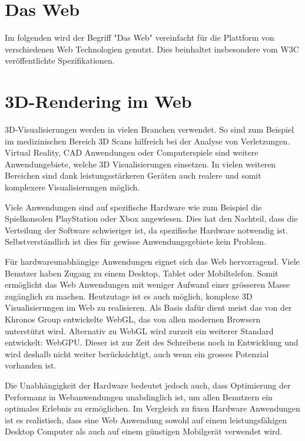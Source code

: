 \section{Das Web}
Im folgenden wird der Begriff "Das Web" vereinfacht für die Plattform von verschiedenen Web Technologien genutzt. Dies beinhaltet insbesondere vom W3C veröffentlichte Spezifikationen.

\section{3D-Rendering im Web}
3D-Visualisierungen werden in vielen Branchen verwendet.
So sind zum Beispiel im medizinischen Bereich 3D Scans hilfreich bei der Analyse von Verletzungen.
Virtual Reality, CAD Anwendungen oder Computerspiele sind weitere Anwendungebiete, welche 3D Visualisierungen einsetzen.
In vielen weiteren Bereichen sind dank leistungsstärkeren Geräten auch realere und somit komplexere Visualisierungen möglich. 

Viele Anwendungen sind auf spezifische Hardware wie zum Beispiel die Spielkonsolen PlayStation oder Xbox angewiesen. Dies hat den Nachteil, dass die Verteilung der Software schwieriger ist, da spezifische Hardware notwendig ist. Selbstverständlich ist dies für gewisse Anwendungsgebiete kein Problem.

Für hardwareunabhängige Anwendungen eignet sich das Web hervorragend. Viele Benutzer haben Zugang zu einem Desktop, Tablet oder Mobiltelefon.
Somit ermöglicht das Web Anwendungen mit weniger Aufwand einer grösseren Masse zugänglich zu machen.
Heutzutage ist es auch möglich, komplexe 3D Visualisierungen im Web zu realisieren.
Als Basis dafür dient meist das von der Khronos Group entwickelte WebGL, das von allen modernen Browsern unterstützt wird.
Alternativ zu WebGL wird zurzeit ein weiterer Standard entwickelt: WebGPU.
Dieser ist zur Zeit des Schreibens noch in Entwicklung und wird deshalb nicht weiter berücksichtigt, auch wenn ein grosses Potenzial vorhanden ist.

Die Unabhängigkeit der Hardware bedeutet jedoch auch, dass Optimierung der Performanz in Webanwendungen unabdinglich ist, um allen Benutzern ein optimales Erlebnis zu ermöglichen.
Im Vergleich zu fixen Hardware Anwendungen ist es realistisch, dass eine Web Anwendung sowohl auf einem leistungsfähigen Desktop Computer als auch auf einem günstigen Mobilgerät verwendet wird.

